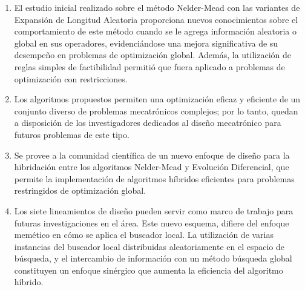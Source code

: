  \begin{enumerate} 
 	
 	 \item El estudio inicial realizado sobre el método Nelder-Mead con las variantes de Expansión de Longitud Aleatoria proporciona nuevos conocimientos sobre el comportamiento de este método cuando se le agrega información aleatoria o global en sus operadores, evidenciándose una mejora significativa de su desempeño en problemas de optimización global. Además, la utilización de reglas simples de factibilidad permitió que fuera aplicado a problemas de optimización con restricciones.
 	 
 	 \item Los algoritmos propuestos permiten una optimización eficaz y eficiente de un conjunto diverso de problemas mecatrónicos complejos; por lo tanto, quedan a disposición de los investigadores dedicados al diseño mecatrónico para futuros problemas de este tipo.
 	 \item Se provee a la comunidad científica de un nuevo enfoque de diseño para la hibridación entre los algoritmos Nelder-Mead y Evolución Diferencial, que permite la implementación de algoritmos híbridos eficientes para problemas restringidos de optimización global.
 	 	
 	 \item Los siete lineamientos de diseño pueden servir como marco de trabajo para futuras investigaciones en el área. Este nuevo esquema, difiere del enfoque memético en cómo se aplica el buscador local. La utilización de varias instancias del buscador local  distribuidas aleatoriamente en el espacio de búsqueda, y el intercambio de información con un método búsqueda global constituyen un enfoque sinérgico que aumenta la eficiencia del algoritmo híbrido. 
 	
 \end{enumerate}
 

 \newpage
  
